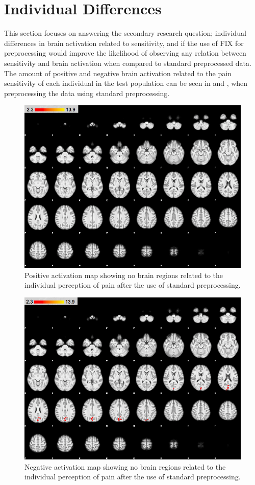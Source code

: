 \section{Individual Differences}

This section focuses on answering the secondary research question; individual differences in brain activation related to sensitivity, and if the use of FIX for preprocessing would improve the likelihood of observing any relation between sensitivity and brain activation when compared to standard preprocessed data. The amount of positive and negative brain activation related to the pain sensitivity of each individual in the test population can be seen in  and , when preprocessing the data using standard preprocessing.  

\begin{figure}[H]                 
	\includegraphics[width=.65\textwidth]{figures/Results/STD_pos_ID}  
	\caption{Positive activation map showing no brain regions related to the individual perception of pain after the use of standard preprocessing. }
	\label{STD_pos_ID} 
\end{figure}

\begin{figure}[H]                 
	\includegraphics[width=.65\textwidth]{figures/Results/STD_neg_ID}  
	\caption{Negative activation map showing no brain regions related to the individual perception of pain after the use of standard preprocessing.}
	\label{STD_neg_ID} 
\end{figure}
 
